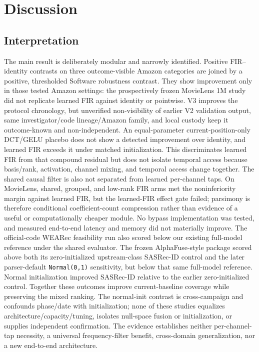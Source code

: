 \section{Discussion}\label{sec:6}

\subsection{Interpretation}\label{sec:6.1}

The main result is deliberately modular and narrowly identified.
Positive FIR--identity contrasts on three outcome-visible Amazon categories are joined by a positive, thresholded Software robustness contrast.
They show improvement only in those tested Amazon settings: the prospectively frozen MovieLens 1M study did not replicate learned FIR against identity or pointwise.
V3 improves the protocol chronology, but unverified non-visibility of earlier V2 validation output, same investigator/code lineage/Amazon family, and local custody keep it outcome-known and non-independent.
An equal-parameter current-position-only DCT/GELU placebo does not show a detected improvement over identity, and learned FIR exceeds it under matched initialization.
This discriminates learned FIR from that compound residual but does not isolate temporal access because basis/rank, activation, channel mixing, and temporal access change together.
The shared causal filter is also not separated from learned per-channel taps. On MovieLens, shared, grouped, and low-rank FIR arms met the noninferiority margin against learned FIR, but the learned-FIR effect gate failed; parsimony is therefore conditional coefficient-count compression rather than evidence of a useful or computationally cheaper module. No bypass implementation was tested, and measured end-to-end latency and memory did not materially improve.
The official-code WEARec feasibility run also scored below our existing full-model reference under the shared evaluator. The frozen AlphaFuse-style package scored above both its zero-initialized upstream-class SASRec-ID control and the later parser-default \texttt{Normal(0,1)} sensitivity, but below that same full-model reference. Normal initialization improved SASRec-ID relative to the earlier zero-initialized control. Together these outcomes improve current-baseline coverage while preserving the mixed ranking. The normal-init contrast is cross-campaign and confounds phase/date with initialization; none of these studies equalizes architecture/capacity/tuning, isolates null-space fusion or initialization, or supplies independent confirmation.
The evidence establishes neither per-channel-tap necessity, a universal frequency-filter benefit, cross-domain generalization, nor a new end-to-end architecture.

